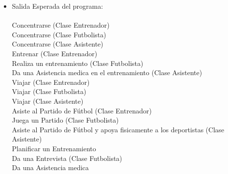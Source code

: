 \documentclass{exam}
\begin{document}
\begin{questions}
\begin{itemize}
  \begin{itemize}
    \item Salida Esperada del programa:\\ \\
Concentrarse (Clase Entrenador)\\
Concentrarse (Clase Futbolista)\\
Concentrarse (Clase Asistente)\\
Entrenar (Clase Entrenador)\\
Realiza un entrenamiento (Clase Futbolista)\\
Da una Asistencia medica en el entrenamiento (Clase Asistente)\\
Viajar (Clase Entrenador)\\
Viajar (Clase Futbolista)\\
Viajar (Clase Asistente)\\
Asiste al Partido de Fútbol (Clase Entrenador)\\
Juega un Partido (Clase Futbolista)\\
Asiste al Partido de Fútbol y apoya fisicamente a los deportistas (Clase Asistente)\\
Planificar un Entrenamiento\\
Da una Entrevista (Clase Futbolista)\\
Da una Asistencia medica\\
  \end{itemize}
\end{itemize}
\end{questions}
\end{document}
